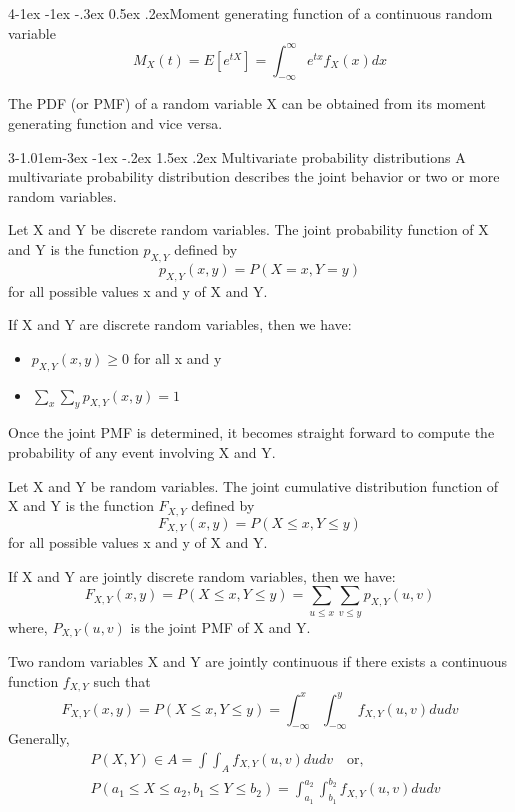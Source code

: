 \documentclass{tufte-handout}
\makeatletter
\renewcommand{\paragraph}{\@startsection{paragraph}%
    {4}{\z@}{-1ex \@plus -1ex \@minus -.3ex}%
    {0.5ex \@plus .2ex}{\normalfont\normalsize\bfseries}}
\renewcommand{\section}{\@startsection{section}%
    {3}{-1.01em}{-3ex \@plus -1ex \@minus -.2ex}%
    {1.5ex \@plus .2ex}
    {\hspace*{-5.5em}\fcolorbox{blue}{blue}{\parbox[c][1.0ex][b]{4em}{\phantom{space}}}
    \normalfont\Large\itshape\color{blue}}}
\makeatother
\begin{document}
\paragraph{Moment generating function of a continuous random variable}
\begin{equation}
    M_X(t) = E[e^{tX}] = \int_{-\infty}^{\infty} e^{tx} f_X(x) dx
\end{equation}

The PDF (or PMF) of a random variable X can be obtained from its moment generating function and vice versa.

\section{Multivariate probability distributions}
A multivariate probability distribution describes the joint behavior or two or more random variables.
\begin{Definition}
    Let X and Y be discrete random variables. The joint probability function of X and Y is the function
    $ p_{X,Y} $ defined by
    \[p_{X,Y}(x,y)=P(X=x,Y=y)\]
    for all possible values x and y of X and Y.
\end{Definition}

If X and Y are discrete random variables, then we have:
\begin{itemize}
    \item \( p_{X,Y}(x,y) \geq 0 \) for all x and y
    \item \( \sum_x \sum_y p_{X,Y}(x,y) = 1 \)
\end{itemize}
Once the joint PMF is determined, it becomes 
straight forward to compute the probability of any event involving X and Y.

\begin{Definition}
    Let X and Y be random variables. The joint cumulative distribution function of X and Y is the function
    $ F_{X,Y} $ defined by
    \[F_{X,Y}(x,y)=P(X\leq x, Y\leq y)\]
    for all possible values x and y of X and Y.
\end{Definition}

If X and Y are jointly discrete random variables, then we have:
\begin{equation}
    F_{X,Y}(x,y) = P(X\leq x, Y\leq y) =
    \sum_{u\leq x} \sum_{v\leq y} p_{X,Y}(u,v)
\end{equation}
where, \( P_{X,Y}(u,v) \) is the joint PMF of X and Y.

Two random variables X and Y are jointly continuous if there exists a continuous function \( f_{X,Y} \) such that
\begin{equation}
    F_{X,Y}(x,y) = P(X\leq x, Y\leq y) = \int_{-\infty}^{x} \int_{-\infty}^{y} f_{X,Y}(u,v) du dv
\end{equation}
Generally,
\begin{align*}
    &P(X,Y)\in A = \int \int_A f_{X,Y}(u,v) du dv\quad \text{or,}\\
    &P(a_1 \leq X \leq a_2, b_1 \leq Y \leq b_2) = \int_{a_1}^{a_2} \int_{b_1}^{b_2} f_{X,Y}(u,v) du dv
\end{align*}
\end{document}
